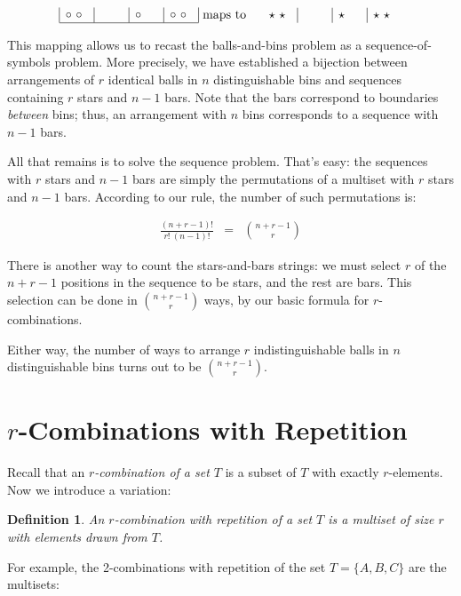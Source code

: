 \documentclass[twoside,12pt]{article}
\newtheorem{definition}{Definition}
\newcommand{\beqn}{\begin{eqnarray*}}
\newcommand{\eeqn}{\end{eqnarray*}}
\begin{document}
\beqn
\begin{array}{|p{0.25in}|p{0.25in}|p{0.25in}|p{0.25in}|}
$\circ$ $\circ$ & & $\circ$ & $\circ$ $\circ$ \\ \hline
\end{array}
& \text{ maps to } &
\begin{array}{p{0.25in}|p{0.25in}|p{0.25in}|p{0.25in}}
$\star$ $\star$ & & $\star$ & $\star$ $\star$ \\
\end{array}
\eeqn

This mapping allows us to recast the balls-and-bins problem as a
sequence-of-symbols problem.  More precisely, we have established a
bijection between arrangements of $r$ identical balls in $n$
distinguishable bins and sequences containing $r$ stars and $n-1$
bars.  Note that the bars correspond to boundaries {\em between}
bins; thus, an arrangement with $n$ bins corresponds to a sequence with
$n-1$ bars.

All that remains is to solve the sequence problem.  That's easy: the
sequences with $r$ stars and $n-1$ bars are simply the permutations of
a multiset with $r$ stars and $n-1$ bars.  According to our rule, the
number of such permutations is:

\beqn
\frac{(n+r-1)!}{r!\ (n-1)!} & = & \binom{n + r - 1}{r}
\eeqn

\noindent There is another way to count the stars-and-bars strings: we
must select $r$ of the $n + r - 1$ positions in the sequence to be
stars, and the rest are bars.  This selection can be done in $\binom{n
+ r -1}{r}$ ways, by our basic formula for $r$-combinations.

Either way, the number of ways to arrange $r$ indistinguishable balls
in $n$ distinguishable bins turns out to be $\binom{n + r -1}{r}$.

\section{$r$-Combinations with Repetition}

Recall that an {\em $r$-combination of a set $T$} is a subset of $T$
with exactly $r$-elements.  Now we introduce a variation:

\begin{definition}
An {\em $r$-combination with repetition of a set $T$} is a multiset of
size $r$ with elements drawn from $T$.
\end{definition}

\noindent For example, the 2-combinations with repetition of the set $T = \{ A,
B, C \}$ are the multisets:
\end{document}
